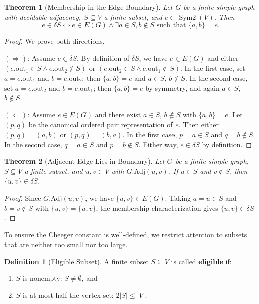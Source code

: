 \documentclass[11pt]{article}
\theoremstyle{plain}
\newtheorem*{theorem}{Theorem}
\theoremstyle{definition}
\newtheorem*{definition}{Definition}
\theoremstyle{remark}
\begin{document}
\begin{theorem}[Membership in the Edge Boundary]
Let $G$ be a finite simple graph with decidable adjacency, $S \subseteq V$ a finite subset, and $e \in \operatorname{Sym2}(V)$. Then
\[
e \in \delta S \Longleftrightarrow e \in E(G) \land \exists a \in S, b \notin S \text{ such that } \{a, b\} = e.
\]
\end{theorem}

\begin{proof}
We prove both directions.

$(\Rightarrow)$: Assume $e \in \delta S$. By definition of $\delta S$, we have $e \in E(G)$ and either $(e.\text{out}_1 \in S \land e.\text{out}_2 \notin S)$ or $(e.\text{out}_2 \in S \land e.\text{out}_1 \notin S)$. In the first case, set $a = e.\text{out}_1$ and $b = e.\text{out}_2$; then $\{a, b\} = e$ and $a \in S$, $b \notin S$. In the second case, set $a = e.\text{out}_2$ and $b = e.\text{out}_1$; then $\{a, b\} = e$ by symmetry, and again $a \in S$, $b \notin S$.

$(\Leftarrow)$: Assume $e \in E(G)$ and there exist $a \in S$, $b \notin S$ with $\{a, b\} = e$. Let $(p, q)$ be the canonical ordered pair representation of $e$. Then either $(p, q) = (a, b)$ or $(p, q) = (b, a)$. In the first case, $p = a \in S$ and $q = b \notin S$. In the second case, $q = a \in S$ and $p = b \notin S$. Either way, $e \in \delta S$ by definition.
\end{proof}

\begin{theorem}[Adjacent Edge Lies in Boundary]
Let $G$ be a finite simple graph, $S \subseteq V$ a finite subset, and $u, v \in V$ with $G.\text{Adj}(u, v)$. If $u \in S$ and $v \notin S$, then $\{u, v\} \in \delta S$.
\end{theorem}

\begin{proof}
Since $G.\text{Adj}(u, v)$, we have $\{u, v\} \in E(G)$. Taking $a = u \in S$ and $b = v \notin S$ with $\{u, v\} = \{u, v\}$, the membership characterization gives $\{u, v\} \in \delta S$.
\end{proof}

To ensure the Cheeger constant is well-defined, we restrict attention to subsets that are neither too small nor too large.

\begin{definition}[Eligible Subset]
A finite subset $S \subseteq V$ is called \textbf{eligible} if:
\begin{enumerate}
\item $S$ is nonempty: $S \neq \emptyset$, and
\item $S$ is at most half the vertex set: $2|S| \leq |V|$.
\end{enumerate}
\end{definition}
\end{document}
